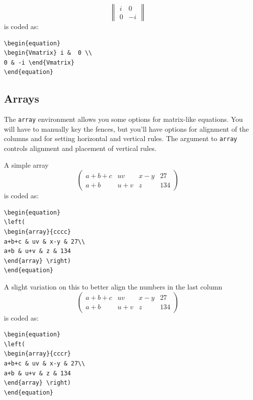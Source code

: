 \documentclass[lettersize,journal]{IEEEtran}
\begin{document}
\begin{equation}
\begin{Vmatrix} i &  0 \\ 
0 & -i \end{Vmatrix}
\end{equation}
is coded as:
\begin{verbatim}
\begin{equation}
\begin{Vmatrix} i &  0 \\ 
0 & -i \end{Vmatrix}
\end{equation}\end{verbatim}

\subsection{Arrays}
\noindent The {\tt{array}} environment allows you some options for matrix-like equations. You will have to manually key the fences, but you'll have options for alignment of the columns and for setting horizontal and vertical rules. The argument to {\tt{array}} controls alignment and placement of vertical rules.

A simple array
\begin{equation}
\left(
\begin{array}{cccc}
a+b+c & uv & x-y & 27\\
a+b & u+v & z & 134
\end{array}\right)
\end{equation}
is coded as:
\begin{verbatim}
\begin{equation}
\left(
\begin{array}{cccc}
a+b+c & uv & x-y & 27\\
a+b & u+v & z & 134
\end{array} \right)
\end{equation}
\end{verbatim}

A slight variation on this to better align the numbers in the last column
\begin{equation}
\left(
\begin{array}{cccr}
a+b+c & uv & x-y & 27\\
a+b & u+v & z & 134
\end{array}\right)
\end{equation}
is coded as:
\begin{verbatim}
\begin{equation}
\left(
\begin{array}{cccr}
a+b+c & uv & x-y & 27\\
a+b & u+v & z & 134
\end{array} \right)
\end{equation}
\end{verbatim}
\end{document}
